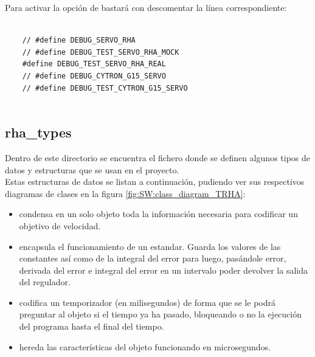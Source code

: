         Para activar la opción de  bastará con descomentar la línea correspondiente:

        \lstset{language=C, breaklines=true, basicstyle=\footnotesize}
        \begin{lstlisting}[frame=single]
        
    // #define DEBUG_SERVO_RHA
    // #define DEBUG_TEST_SERVO_RHA_MOCK
    #define DEBUG_TEST_SERVO_RHA_REAL
    // #define DEBUG_CYTRON_G15_SERVO
    // #define DEBUG_TEST_CYTRON_G15_SERVO
            
        \end{lstlisting}
        
    \subsection{rha\_types} \label{subsec:SW:lib:rha_types}
        Dentro de este directorio se encuentra el fichero  donde se definen algunos tipos de datos y estructuras que se usan en el proyecto.
        \\
        
        Estas estructuras de datos se listan a continuación, pudiendo ver sus respectivos diagramas de clases en la figura \ref{fig:SW:class_diagram_TRHA}:
        
        \begin{itemize}
            \item {} condensa en un solo objeto toda la información necesaria para codificar un objetivo de velocidad.
            \item {} encapsula el funcionamiento de un  estandar. Guarda los valores de las constantes así como de la integral del error para luego, pasándole error, derivada del error e integral del error en un intervalo poder devolver la salida del regulador.
            \item {} codifica un temporizador (en milisegundos) de forma que se le podrá preguntar al objeto si el tiempo ya ha pasado, bloqueando o no la ejecución del programa hasta el final del tiempo.
            \item {} hereda las características del objeto  funcionando en microsegundos.
        
        \end{itemize}
        
